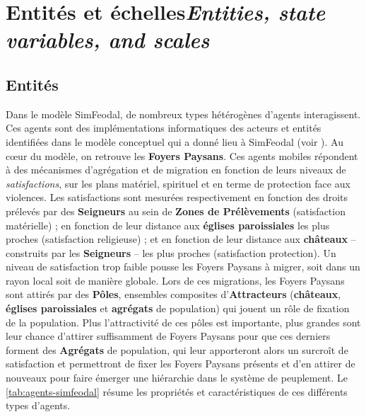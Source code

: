 \section[Entités et échelles -- \textit{Entities, state variables, and scales}]{Entités et échelles\protect\newline \large{\textit{Entities, state variables, and scales}} }

\subsection{Entités}

Dans le modèle SimFeodal, de nombreux types hétérogènes d'agents interagissent. Ces agents sont des implémentations informatiques des acteurs et entités identifiées dans le modèle conceptuel qui a donné lieu à SimFeodal (voir \textcite[Tableau 1, \ppno~309--310]{cura_transition_2017}).
Au cœur du modèle, on retrouve les \textbf{Foyers Paysans}. Ces agents mobiles répondent à des mécanismes d'agrégation et de migration en fonction de leurs niveaux de \textit{satisfactions}, sur les plans matériel, spirituel et en terme de protection face aux violences.
Les satisfactions sont mesurées respectivement en fonction des droits prélevés par des \textbf{Seigneurs} au sein de \textbf{Zones de Prélèvements} (satisfaction matérielle) ; en fonction de leur distance aux \textbf{églises paroissiales} les plus proches (satisfaction religieuse) ; et en fonction de leur distance aux \textbf{châteaux} -- construits par les \textbf{Seigneurs} -- les plus proches (satisfaction protection).
Un niveau de satisfaction trop faible pousse les Foyers Paysans à migrer, soit dans un rayon local soit de manière globale.
Lors de ces migrations, les Foyers Paysans sont attirés par des \textbf{Pôles}, ensembles composites d'\textbf{Attracteurs} (\textbf{châteaux}, \textbf{églises paroissiales} et \textbf{agrégats} de population) qui jouent un rôle de fixation de la population.
Plus l'attractivité de ces pôles est importante, plus grandes sont leur chance d'attirer suffisamment de Foyers Paysans pour que ces derniers forment des \textbf{Agrégats} de population, qui leur apporteront alors un surcroît de satisfaction et permettront de fixer les Foyers Paysans présents et d'en attirer de nouveaux pour faire émerger une hiérarchie dans le système de peuplement.
Le \cref{tab:agents-simfeodal} résume les propriétés et caractéristiques de ces différents types d'agents.


